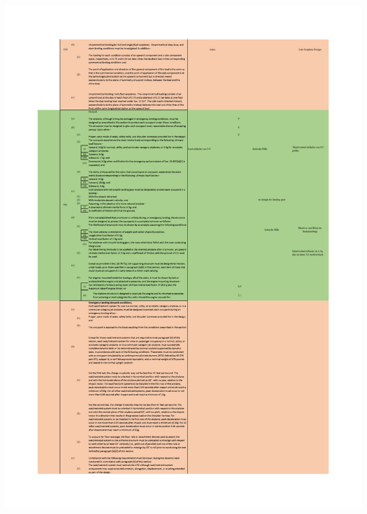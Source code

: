 \begin{table}[H]
\centering
\includegraphics[width=1.0\textwidth, trim={19mm 19mm 19mm 19mm}, clip]{bilder/Tabellen/MPP_Konstruktion_9.pdf}
\end{table}

